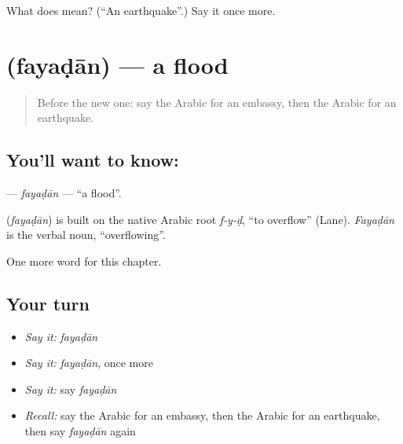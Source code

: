 \begin{tcolorbox}[breakable,colback=teal!4,colframe=teal!35!black,title={Before you move on}]
What does  mean? (\textquotedblleft{}An earthquake\textquotedblright{}.) Say it once more.
\end{tcolorbox}
\section[\texorpdfstring{\ar{فيضان} (fayaḍān)}{فيضان (fayaḍān)}]{ (fayaḍān) — a flood}

\label{lesson:AR-C236-fayadan}



\begin{quote}
Before the new one: say the Arabic for an embassy, then the Arabic for an earthquake.
\end{quote}

\subsection*{You'll want to know: }
\textbf{} — \emph{fayaḍān} — \textquotedblleft{}a flood\textquotedblright{}.

\begin{cousinweb}
\textbf{} (\emph{fayaḍān}) is built on the native Arabic root \emph{f-y-ḍ}, \textquotedblleft{}to overflow\textquotedblright{} (Lane). \emph{Fayaḍān} is the verbal noun, \textquotedblleft{}overflowing\textquotedblright{}.
\end{cousinweb}

\begin{grammarlens}[title={What you've built}]
One more word for this chapter.
\end{grammarlens}

\subsection*{Your turn}
\begin{itemize}
\raggedright
  \item \emph{Say it:} \emph{fayaḍān}
  \item \emph{Say it:} \emph{fayaḍān}, once more
  \item \emph{Say it:} say \emph{fayaḍān}
  \item \emph{Recall:} say the Arabic for an embassy, then the Arabic for an earthquake, then say \emph{fayaḍān} again
\end{itemize}

